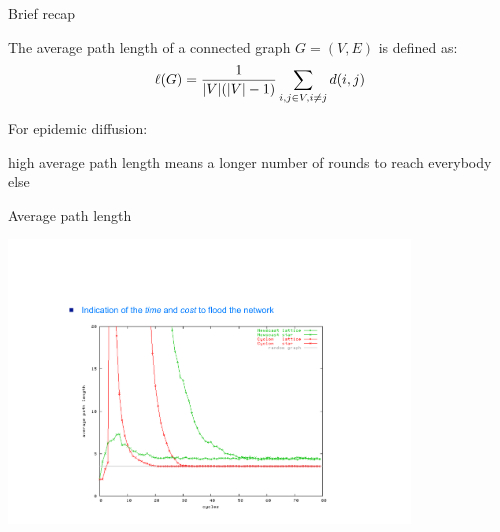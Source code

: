 \begin{frame}{Brief recap}

\begin{definition}
The \alert{average path length} of a connected graph $G=(V,E)$ is defined as:
\[
  \ell(G) = \frac{1}{|V|(|V|-1)} \sum_{i,j \in V, i \neq j} d(i,j)
\]
\end{definition}

\bigskip
For epidemic diffusion:
\BI
\item high average path length means a longer number of rounds to reach
  everybody else
\EI


\end{frame}

\begin{frame}{Average path length}
	
\begin{center}
\includegraphics[width=0.8\textwidth]{figs/11/path}	
\end{center}

	
\end{frame}


